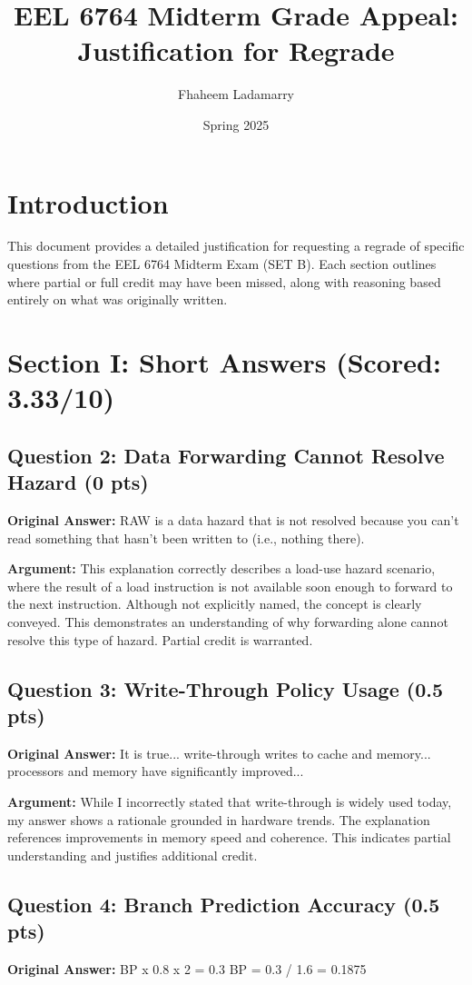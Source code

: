 \documentclass[11pt]{article}
\title{EEL 6764 Midterm Grade Appeal: Justification for Regrade}
\author{Fhaheem Ladamarry}
\date{Spring 2025}
\begin{document}
\maketitle

\section*{Introduction}
This document provides a detailed justification for requesting a regrade of specific questions from the EEL 6764 Midterm Exam (SET B). Each section outlines where partial or full credit may have been missed, along with reasoning based entirely on what was originally written.

\section*{Section I: Short Answers (Scored: 3.33/10)}

\subsection*{Question 2: Data Forwarding Cannot Resolve Hazard (0 pts)}
\textbf{Original Answer:} RAW is a data hazard that is not resolved because you can't read something that hasn't been written to (i.e., nothing there).

\textbf{Argument:} This explanation correctly describes a load-use hazard scenario, where the result of a load instruction is not available soon enough to forward to the next instruction. Although not explicitly named, the concept is clearly conveyed. This demonstrates an understanding of why forwarding alone cannot resolve this type of hazard. Partial credit is warranted.

\subsection*{Question 3: Write-Through Policy Usage (0.5 pts)}
\textbf{Original Answer:} It is true... write-through writes to cache and memory... processors and memory have significantly improved...

\textbf{Argument:} While I incorrectly stated that write-through is widely used today, my answer shows a rationale grounded in hardware trends. The explanation references improvements in memory speed and coherence. This indicates partial understanding and justifies additional credit.

\subsection*{Question 4: Branch Prediction Accuracy (0.5 pts)}
\textbf{Original Answer:} BP x 0.8 x 2 = 0.3 \Rightarrow BP = 0.3 / 1.6 = 0.1875
\end{document}
